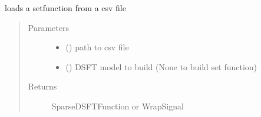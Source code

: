 \documentclass[letterpaper,10pt,english]{sphinxmanual}
\begin{document}

\begin{fulllineitems}
\label{\detokenize{setFTs:setFTs.setfunctions.build_from_csv}}
\sphinxAtStartPar
loads a setfunction from a csv file
\begin{quote}\begin{description}
\item[{Parameters}] \leavevmode\begin{itemize}
\item {} 
\sphinxAtStartPar
{} () \textendash{} path to csv file

\item {} 
\sphinxAtStartPar
{} () \textendash{} DSFT model to build (None to build set function)

\end{itemize}

\item[{Returns}] \leavevmode
\sphinxAtStartPar
SparseDSFTFunction or WrapSignal

\end{description}\end{quote}

\end{fulllineitems}

\end{document}
